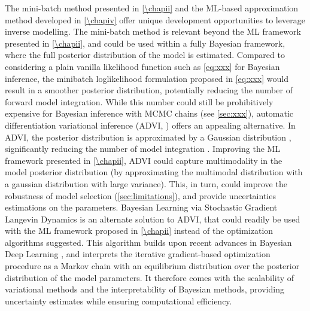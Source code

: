 The mini-batch method presented in \cref{\chapii} and the ML-based approximation method developed in \cref{\chapiv} offer unique development opportunities to leverage inverse modelling.
The mini-batch method is relevant beyond the ML framework presented in \cref{\chapii}, and could be used within a fully Bayesian framework, where the full posterior distribution of the model is estimated. Compared to considering a plain vanilla likelihood function such as \cref{eq:xxx} for Bayesian inference, the minibatch loglikelihood formulation proposed in \cref{eq:xxx} would result in a smoother posterior distribution, potentially reducing the number of forward model integration.
% 
While this number could still be prohibitively expensive for Bayesian inference with MCMC chains (see \cref{sec:xxx}), automatic differentiation variational inference (ADVI, \cite{Morningstar2020,Gosh2021}) offers an appealing alternative. In ADVI, the posterior distribution is approximated by a Gaussian distribution \citep{Morningstar2020}, significantly reducing the number of model integration \citep{Morningstar2020}. Improving the ML framework presented in \cref{\chapii}, ADVI could capture multimodality in the model posterior distribution (by approximating the multimodal distribution with a gaussian distribution with large variance). This, in turn, could improve the robustness of model selection (\cref{sec:limitations}), and provide uncertainties estimations on the parameters.
% 
Bayesian Learning via Stochastic Gradient Langevin Dynamics \citep{Welling2011BayesianLV} is an alternate solution to ADVI, that could readily be used with the ML framework proposed in \cref{\chapii} instead of the optimization algorithms suggested. This algorithm builds upon recent advances in Bayesian Deep Learning \citep{Wilson2020}, and interprets the iterative gradient-based optimization procedure as a Markov chain with an equilibrium distribution over the posterior distribution of the model parameters. It therefore comes with the scalability of variational methods and the interpretability of Bayesian methods, providing uncertainty estimates while ensuring computational efficiency.


